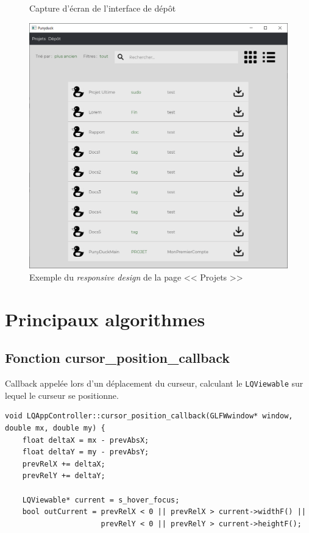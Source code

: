 \documentclass[twoside]{report}
\begin{document}
\begin{appendix}
\begin{figure}
    \caption{Capture d'écran de l'interface de dépôt}
    \label{Depot}
\end{figure}
\begin{figure}
    \centering
    \includegraphics[scale=0.4]{punyduck-img-6.png}
    \caption{Exemple du \textit{responsive design} de la page << Projets >> }
    \label{resp1}
\end{figure}

\chapter{Principaux algorithmes}
\section{Fonction cursor\_position\_callback}
Callback appelée lors d'un déplacement du curseur, calculant le \verb!LQViewable! sur lequel le curseur se positionne.
\begin{lstlisting}[style=cpp, caption=LQAppController::cursor\_position\_callback, label=cpc]
void LQAppController::cursor_position_callback(GLFWwindow* window, double mx, double my) {
    float deltaX = mx - prevAbsX;
    float deltaY = my - prevAbsY;
    prevRelX += deltaX;
    prevRelY += deltaY;

    LQViewable* current = s_hover_focus;
    bool outCurrent = prevRelX < 0 || prevRelX > current->widthF() ||
                      prevRelY < 0 || prevRelY > current->heightF();


\end{lstlisting}
\end{appendix}
\end{document}
